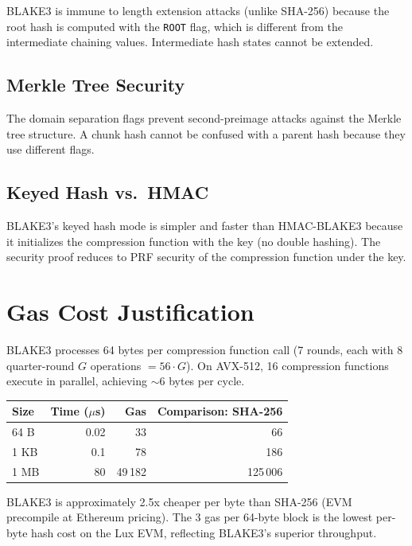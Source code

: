 \documentclass[11pt,a4paper]{article}
\begin{document}
BLAKE3 is immune to length extension attacks (unlike SHA-256) because the
root hash is computed with the \texttt{ROOT} flag, which is different from
the intermediate chaining values. Intermediate hash states cannot be extended.

\subsection{Merkle Tree Security}

The domain separation flags prevent second-preimage attacks against the
Merkle tree structure. A chunk hash cannot be confused with a parent hash
because they use different flags.

\subsection{Keyed Hash vs.\ HMAC}

BLAKE3's keyed hash mode is simpler and faster than HMAC-BLAKE3 because it
initializes the compression function with the key (no double hashing).
The security proof reduces to PRF security of the compression function
under the key.

\section{Gas Cost Justification}

BLAKE3 processes 64 bytes per compression function call (7 rounds, each with
8 quarter-round $G$ operations $= 56 \cdot G$). On AVX-512, 16 compression
functions execute in parallel, achieving $\sim$6 bytes per cycle.

\begin{table}[H]
\centering
\begin{tabular}{lrrr}
\toprule
\textbf{Size} & \textbf{Time ($\mu$s)} & \textbf{Gas} & \textbf{Comparison: SHA-256} \\
\midrule
64 B & 0.02 & 33 & 66 \\
1 KB & 0.1 & 78 & 186 \\
1 MB & 80 & 49\,182 & 125\,006 \\
\bottomrule
\end{tabular}
\end{table}

BLAKE3 is approximately 2.5x cheaper per byte than SHA-256 (EVM precompile
at Ethereum pricing). The 3 gas per 64-byte block is the lowest per-byte
hash cost on the Lux EVM, reflecting BLAKE3's superior throughput.
\end{document}
